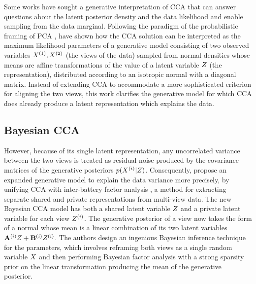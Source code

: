 \documentclass[../thesis.tex]{subfiles}
\begin{document}
Some works have sought a generative interpretation of CCA that can answer questions about the latent posterior density and the data likelihood and enable sampling from the data marginal. Following the paradigm of the probabilistic framing of PCA \cite{tipping1999probabilistic}, \citet{bach2005probabilistic} have shown how the CCA solution can be interpreted as the maximum likelihood parameters of a generative model consisting of two observed variables $\myrv{x}^{(1)}, \myrv{x}^{(2)}$ (the views of the data) sampled from normal densities whose means are affine transformations of the value of a latent variable $\myrv{z}$ (the representation), distributed according to an isotropic normal with a diagonal matrix. Instead of extending CCA to accommodate a more sophisticated criterion for aligning the two views, this work clarifies the generative model for which CCA does already produce a latent representation which explains the data.

\subsection{Bayesian CCA}

However, because of its single latent representation, any uncorrelated variance between the two views is treated as residual noise produced by the covariance matrices of the generative posteriors $p(\myrv{x}^{(i)} | \myrv{z})$. Consequently, \citet{klami2013bayesian} propose an expanded generative model to explain the data variance more precisely, by unifying CCA with inter-battery factor analysis \cite{tucker1958inter, browne1979maximum}, a method for extracting separate shared and private representations from multi-view data. The new Bayesian CCA model has both a shared latent variable $\myrv{z}$ and a private latent variable for each view $\myrv{z}^{(i)}$. The generative posterior of a view now takes the form of a normal whose mean is a linear combination of its two latent variables $\mymatrix{a}^{(i)} \myrv{z} + \mymatrix{b}^{(i)} \myrv{z}^{(i)}$. The authors design an ingenious Bayesian inference technique for the parameters, which involves reframing both views as a single random variable $\myrv{x}$ and then performing Bayesian factor analysis \cite{ghahramani2000variational} with a strong sparsity prior on the linear transformation producing the mean of the generative posterior. 
\end{document}
